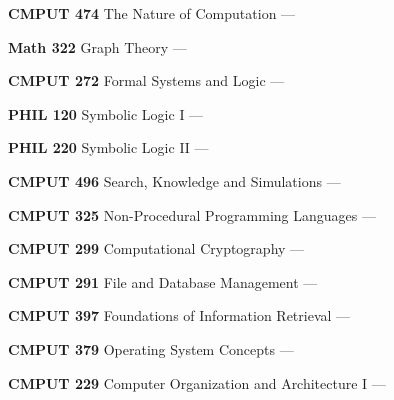 \begin{cventries}
{\begin{cvitems}
      \item {\textbf{CMPUT 474} The Nature of Computation --- }
        \vspace{0.5mm}
      \item {\textbf{Math 322} Graph Theory --- }
        \vspace{0.5mm}
      \item {\textbf{CMPUT 272} Formal Systems and Logic --- }
        \vspace{0.5mm}
      \item {\textbf{PHIL 120} Symbolic Logic I --- }
        \vspace{0.5mm}
      \item {\textbf{PHIL 220} Symbolic Logic II --- }
        \vspace{1.5mm}

      \item {\textbf{CMPUT 496} Search, Knowledge and Simulations --- }
        \vspace{0.5mm}
      \item {\textbf{CMPUT 325} Non-Procedural Programming Languages --- }
        \vspace{0.5mm}
      \item {\textbf{CMPUT 299} Computational Cryptography --- }
        \vspace{0.5mm}
      \item {\textbf{CMPUT 291} File and Database Management --- }
        \vspace{0.5mm}
      \item {\textbf{CMPUT 397} Foundations of Information Retrieval --- }
        \vspace{0.5mm}
      \item {\textbf{CMPUT 379} Operating System Concepts --- }
        \vspace{0.5mm}
      \item {\textbf{CMPUT 229} Computer Organization and Architecture I --- }
        \vspace{1.5mm}


\end{cvitems}}
\end{cventries}
